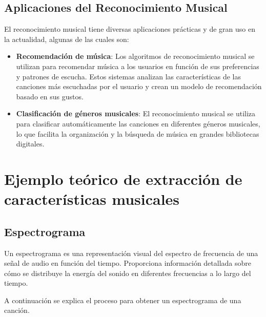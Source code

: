 \subsection{Aplicaciones del Reconocimiento Musical}
El reconocimiento musical tiene diversas aplicaciones prácticas y de gran uso en la actualidad, algunas de las cuales son:

\begin{itemize}
\item \textbf{Recomendación de música}: Los algoritmos de reconocimiento musical se utilizan para recomendar música a los usuarios en función de sus preferencias y patrones de escucha. Estos sistemas analizan las características de las canciones más escuchadas por el usuario y crean un modelo de recomendación basado en sus gustos.

\item \textbf{Clasificación de géneros musicales}: El reconocimiento musical se utiliza para clasificar automáticamente las canciones en diferentes géneros musicales, lo que facilita la organización y la búsqueda de música en grandes bibliotecas digitales.
\end{itemize}

\section{Ejemplo teórico de extracción de características musicales}

\subsection{Espectrograma}
Un espectrograma es una representación visual del espectro de frecuencia de una señal de audio en función del tiempo. Proporciona información detallada sobre cómo se distribuye la energía del sonido en diferentes frecuencias a lo largo del tiempo.

A continuación se explica el proceso para obtener un espectrograma de una canción.

